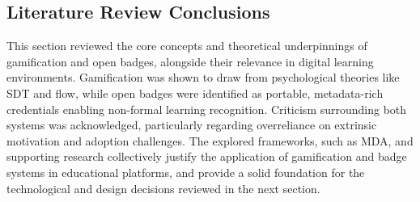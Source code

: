 \subsection{Literature Review Conclusions}

This section reviewed the core concepts and theoretical underpinnings of gamification and open badges, alongside their relevance in digital learning environments. 
Gamification was shown to draw from psychological theories like SDT and flow, while open badges were identified as portable, metadata-rich credentials enabling non-formal learning recognition. 
Criticism surrounding both systems was acknowledged, particularly regarding overreliance on extrinsic motivation and adoption challenges. 
The explored frameworks, such as MDA, and supporting research collectively justify the application of gamification and badge systems in educational platforms, and provide a solid foundation for the technological and design decisions reviewed in the next section.

\newpage
